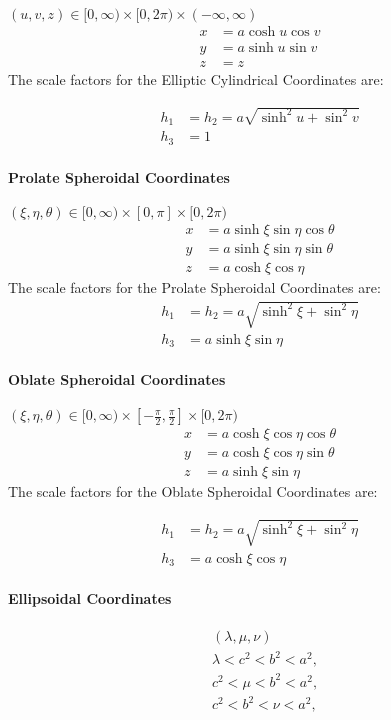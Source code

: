 \((u, v, z)\in[0,\infty)\times[0,2\pi)\times(-\infty,\infty)\)
\begin{align}
x&=a\cosh u \cos v\\
y&=a\sinh u \sin v\\
z&=z
\end{align}
The scale factors for the Elliptic Cylindrical
Coordinates are:

\begin{align}
h_1&=h_2=a\sqrt{\sinh^2u+\sin^2v} \\
h_3&=1
\end{align}
\paragraph{Prolate Spheroidal Coordinates} 

\((\xi, \eta, \theta)\in[0,\infty)\times[0,\pi]\times[0,2\pi)\) 
\begin{align}
x&=a\sinh\xi\sin\eta\cos\theta\\
y&=a\sinh\xi\sin\eta\sin\theta\\
z&=a\cosh\xi\cos\eta
\end{align}
The scale factors for the Prolate Spheroidal
Coordinates are:
\begin{align}
h_1&=h_2=a\sqrt{\sinh^2\xi+\sin^2\eta} \\
h_3&=a\sinh\xi\sin\eta
\end{align}
\paragraph{Oblate Spheroidal Coordinates} 
\((\xi, \eta, \theta)\in[0,\infty)\times\left[-\frac{\pi}{2},\frac{\pi}{2}\right]\times[0,2\pi)\)
\begin{align}
x&=a\cosh\xi\cos\eta\cos\theta\\
y&=a\cosh\xi\cos\eta\sin\theta\\
z&=a\sinh\xi\sin\eta
\end{align}
The scale factors for the Oblate Spheroidal
Coordinates are:

\begin{align}
h_1&=h_2=a\sqrt{\sinh^2\xi+\sin^2\eta} \\
h_3&=a\cosh\xi\cos\eta
\end{align}
\paragraph{Ellipsoidal Coordinates} \begin{align}
& (\lambda, \mu, \nu)\\
& \lambda < c^2 < b^2 < a^2,\\
& c^2 < \mu < b^2 < a^2,\\
& c^2 < b^2 < \nu < a^2,
\end{align}

